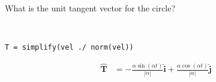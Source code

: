What is the unit tangent vector for the circle?

\begin{solution} \
\begin{lstlisting}
T = simplify(vel ./ norm(vel))
\end{lstlisting}

\begin{align*}
    \boldsymbol{\hat{T}} &= -\frac{\alpha \sin(\alpha t)}{\left|\alpha\right|}\hat{\boldsymbol{i}} + \frac{\alpha \cos(\alpha t)}{\left|\alpha\right|}\hat{\boldsymbol{j}}
\end{align*}
\end{solution}